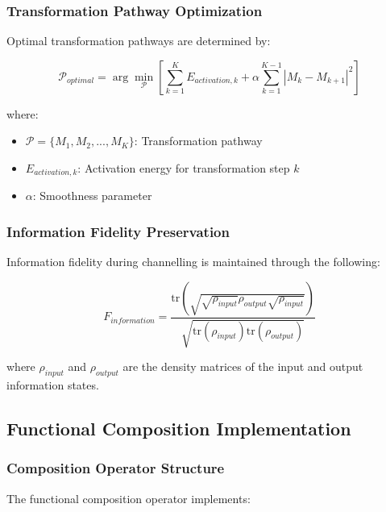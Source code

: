 \documentclass[12pt,a4paper]{article}
\begin{document}
\subsubsection{Transformation Pathway Optimization}

Optimal transformation pathways are determined by:

\begin{equation}
\mathcal{P}_{optimal} = \arg\min_{\mathcal{P}} \left[ \sum_{k=1}^{K} E_{activation,k} + \alpha \sum_{k=1}^{K-1} |M_k - M_{k+1}|^2 \right]
\end{equation}

where:
\begin{itemize}
\item $\mathcal{P} = \{M_1, M_2, ..., M_K\}$: Transformation pathway
\item $E_{activation,k}$: Activation energy for transformation step $k$
\item $\alpha$: Smoothness parameter
\end{itemize}

\subsubsection{Information Fidelity Preservation}

Information fidelity during channelling is maintained through the following:

\begin{equation}
F_{information} = \frac{\text{tr}(\sqrt{\sqrt{\rho_{input}} \rho_{output} \sqrt{\rho_{input}}})}{\sqrt{\text{tr}(\rho_{input}) \text{tr}(\rho_{output})}}
\end{equation}

where $\rho_{input}$ and $\rho_{output}$ are the density matrices of the input and output information states.

\subsection{Functional Composition Implementation}

\subsubsection{Composition Operator Structure}

The functional composition operator implements:
\end{document}
